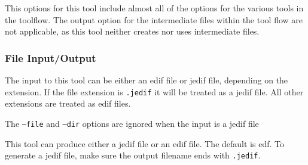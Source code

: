 This options for this tool include almost all of the options for the
various tools in the toolflow. The output option for the intermediate
files within the tool flow are not applicable, as this tool neither
creates nor uses intermediate files.

\subsubsection{File Input/Output}

The input to this tool can be either an edif file or jedif file,
depending on the extension. If the file extension is \texttt{.jedif}
it will be treated as a jedif file. All other extensions are treated
as edif files.

The \texttt{--file} and \texttt{--dir} options are ignored when the
input is a jedif file

This tool can produce either a jedif file or an edif file. The default
is edf. To generate a jedif file, make sure the output filename ends
with \texttt{.jedif}.
